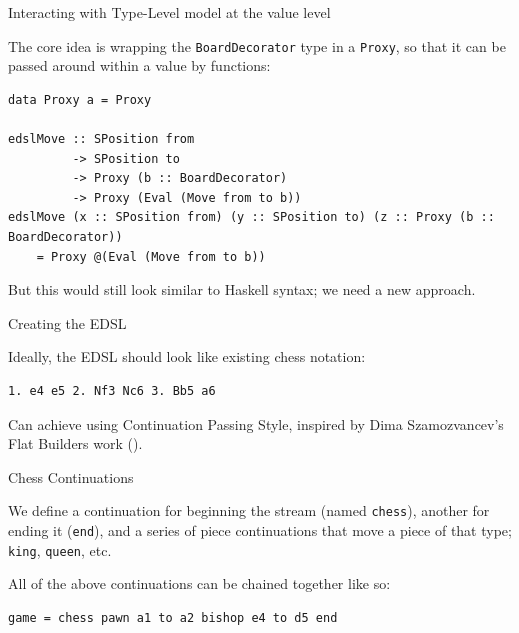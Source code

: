 \documentclass{beamer}
\newcommand{\inline}[1]{\lstinline[basicstyle=\ttfamily]{#1}}
\begin{document}
\begin{frame}[fragile]{Interacting with Type-Level model at the value level}

The core idea is wrapping the \inline{BoardDecorator} type in a \inline{Proxy}, so that it can be passed around within a value by functions:

\begin{lstlisting}
data Proxy a = Proxy

edslMove :: SPosition from
         -> SPosition to
         -> Proxy (b :: BoardDecorator)
         -> Proxy (Eval (Move from to b))
edslMove (x :: SPosition from) (y :: SPosition to) (z :: Proxy (b :: BoardDecorator))
    = Proxy @(Eval (Move from to b))
\end{lstlisting}

But this would still look similar to Haskell syntax; we need a new approach.

\end{frame}

\begin{frame}[fragile]{Creating the EDSL}

Ideally, the EDSL should look like existing chess notation:

\begin{verbatim}
1. e4 e5 2. Nf3 Nc6 3. Bb5 a6
\end{verbatim}


Can achieve using Continuation Passing Style, inspired by Dima Szamozvancev's Flat Builders work (\cite{mezzo}).

\end{frame}

\begin{frame}[fragile]{Chess Continuations}

We define a continuation for beginning the stream (named \inline{chess}), another for ending it (\inline{end}), and a series of piece continuations that move a piece of that type; \inline{king}, \inline{queen}, etc.

All of the above continuations can be chained together like so:

\begin{lstlisting}
game = chess pawn a1 to a2 bishop e4 to d5 end
\end{lstlisting}

\end{frame}
\end{document}
